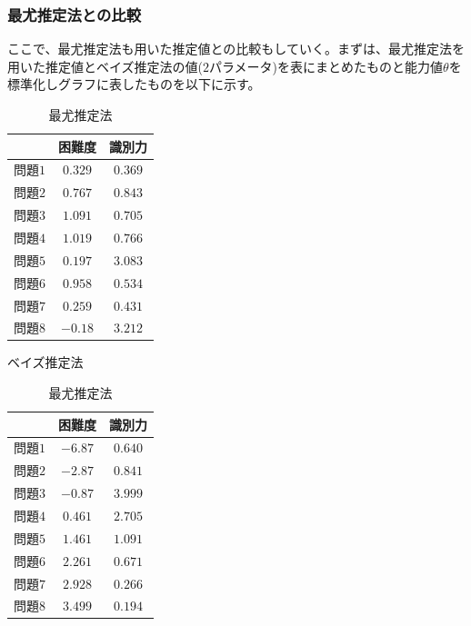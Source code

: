 \documentclass[12pt]{jarticle}
\numberwithin{equation}{subsection}
\begin{document}
\subsubsection{最尤推定法との比較}
ここで、最尤推定法も用いた推定値との比較もしていく。まずは、最尤推定法を用いた推定値とベイズ推定法の値($2$パラメータ)を表にまとめたものと能力値$\theta$を標準化しグラフに表したものを以下に示す。
\begin{table}[H]
  \begin{minipage}[t]{.45\textwidth}
    \begin{center}
      \begin{tabular}{|l||c|c|} \hline
        & 困難度& 識別力 \\ \hline \hline
        $問題1$ & $0.329$ & $0.369$  \\ \hline
        $問題2$ & $0.767$ & $0.843$  \\ \hline
        $問題3$ & $1.091$ & $0.705$   \\ \hline
        $問題4$ & $1.019$ & $0.766$   \\ \hline
        $問題5$ & $0.197$ & $3.083$   \\ \hline
        $問題6$ & $0.958$ & $0.534$   \\ \hline
        $問題7$ & $0.259$ & $0.431$   \\ \hline
        $問題8$ & $-0.18$ & $3.212$   \\ \hline
      \end{tabular}
    \end{center}
    \caption{ベイズ推定法}
  \end{minipage}
  \begin{minipage}[t]{.45\textwidth}
    \vspace{-2.83cm}
    \begin{center}
      \begin{tabular}{|l||c|c|} \hline
        & 困難度& 識別力 \\ \hline \hline
        $問題1$ & $-6.87$ & $0.640$  \\ \hline
        $問題2$ & $-2.87$ & $0.841$  \\ \hline
        $問題3$ & $-0.87$ & $3.999$   \\ \hline
        $問題4$ & $0.461$ & $2.705$   \\ \hline
        $問題5$ & $1.461$ & $1.091$   \\ \hline
        $問題6$ & $2.261$ & $0.671$   \\ \hline
        $問題7$ & $2.928$ & $0.266$   \\ \hline
        $問題8$ & $3.499$ & $0.194$   \\ \hline
      \end{tabular}
    \end{center}
    \caption{最尤推定法}
  \end{minipage}
\end{table}
\end{document}
